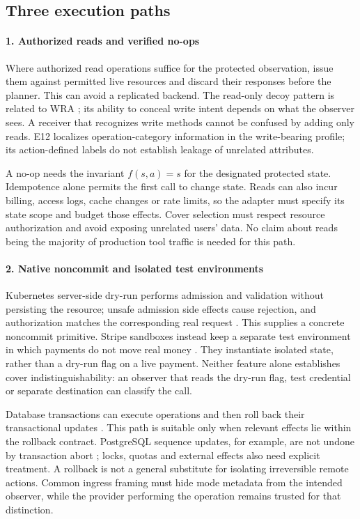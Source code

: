 \subsection{Three execution paths}
\paragraph{1. Authorized reads and verified no-ops}
Where authorized read operations suffice for the protected observation, issue them against permitted live resources and discard their responses before the planner. This can avoid a replicated backend. The read-only decoy pattern is related to WRA \cite{jeong2026wra}; its ability to conceal write intent depends on what the observer sees. A receiver that recognizes write methods cannot be confused by adding only reads. E12 localizes operation-category information in the write-bearing profile; its action-defined labels do not establish leakage of unrelated attributes.

A no-op needs the invariant $f(s,a)=s$ for the designated protected state. Idempotence alone permits the first call to change state. Reads can also incur billing, access logs, cache changes or rate limits, so the adapter must specify its state scope and budget those effects. Cover selection must respect resource authorization and avoid exposing unrelated users' data. No claim about reads being the majority of production tool traffic is needed for this path.

\paragraph{2. Native noncommit and isolated test environments}
Kubernetes server-side dry-run performs admission and validation without persisting the resource; unsafe admission side effects cause rejection, and authorization matches the corresponding real request \cite{kubernetesdryrun}. This supplies a concrete noncommit primitive. Stripe sandboxes instead keep a separate test environment in which payments do not move real money \cite{stripesandboxes}. They instantiate isolated state, rather than a dry-run flag on a live payment. Neither feature alone establishes cover indistinguishability: an observer that reads the dry-run flag, test credential or separate destination can classify the call.

Database transactions can execute operations and then roll back their transactional updates \cite{postgresrollback}. This path is suitable only when relevant effects lie within the rollback contract. PostgreSQL sequence updates, for example, are not undone by transaction abort \cite{postgressequences}; locks, quotas and external effects also need explicit treatment. A rollback is not a general substitute for isolating irreversible remote actions. Common ingress framing must hide mode metadata from the intended observer, while the provider performing the operation remains trusted for that distinction.

